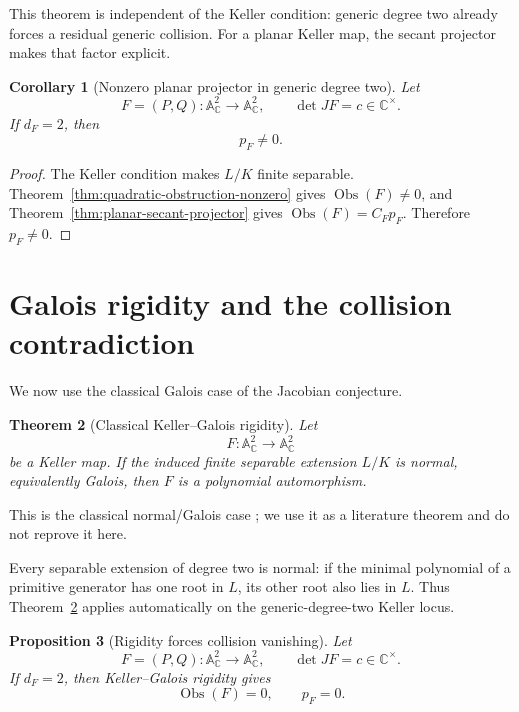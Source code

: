 \documentclass[11pt]{article}
\newtheorem{theorem}{Theorem}[section]
\newtheorem{proposition}[theorem]{Proposition}
\newtheorem{corollary}[theorem]{Corollary}
\newcommand{\A}{\mathbb A}
\newcommand{\C}{\mathbb C}
\newcommand{\Obs}{\operatorname{Obs}}
\begin{document}
This theorem is independent of the Keller condition: generic degree two
already forces a residual generic collision.  For a planar Keller map, the
secant projector makes that factor explicit.

\begin{corollary}[Nonzero planar projector in generic degree two]
\label{cor:quadratic-projector-nonzero}
Let
\[
  F=(P,Q)\colon\A^2_{\C}\longrightarrow\A^2_{\C},
  \qquad
  \det JF=c\in\C^\times.
\]
If \(d_F=2\), then
\[
  p_F\neq0.
\]
\end{corollary}

\begin{proof}
The Keller condition makes \(L/K\) finite separable.
Theorem~\ref{thm:quadratic-obstruction-nonzero} gives
\(\Obs(F)\neq0\), and
Theorem~\ref{thm:planar-secant-projector} gives
\(\Obs(F)=C_Fp_F\).  Therefore \(p_F\neq0\).
\end{proof}

\section{Galois rigidity and the collision contradiction}
\label{sec:rigidity-contradiction}

We now use the classical Galois case of the Jacobian conjecture.

\begin{theorem}[Classical Keller--Galois rigidity]
\label{thm:keller-galois-rigidity}
Let
\[
  F\colon\A^2_{\C}\longrightarrow\A^2_{\C}
\]
be a Keller map.  If the induced finite separable extension \(L/K\) is
normal, equivalently Galois, then \(F\) is a polynomial automorphism.
\end{theorem}

This is the classical normal/Galois case
\cite{Campbell1973,Razar1979,Wright1981}; we use it as a literature theorem
and do not reprove it here.

Every separable extension of degree two is normal: if the minimal polynomial
of a primitive generator has one root in \(L\), its other root also lies in
\(L\).  Thus Theorem~\ref{thm:keller-galois-rigidity} applies automatically
on the generic-degree-two Keller locus.

\begin{proposition}[Rigidity forces collision vanishing]
\label{prop:rigidity-projector-zero}
Let
\[
  F=(P,Q)\colon\A^2_{\C}\longrightarrow\A^2_{\C},
  \qquad
  \det JF=c\in\C^\times.
\]
If \(d_F=2\), then Keller--Galois rigidity gives
\[
  \Obs(F)=0,\qquad p_F=0.
\]
\end{proposition}
\end{document}
